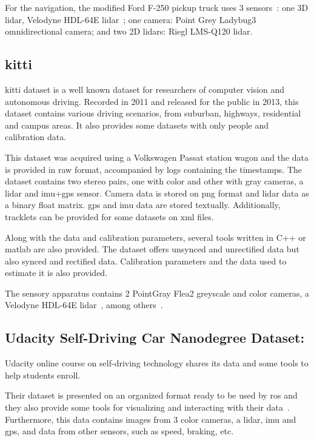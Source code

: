For the navigation, the modified Ford F-250 pickup truck uses 3 sensors~\cite{Pandey2011}: one 3D \ac{lidar}, Velodyne HDL-64E lidar~\cite{Wang2018a}; one camera: Point Grey Ladybug3 omnidirectional camera; and two 2D \acp{lidar}: Riegl LMS-Q120 lidar.


\subsection{\ac{kitti}}
\ac{kitti} dataset is a well known dataset for researchers of computer vision and autonomous driving. Recorded in 2011 and released for the public in 2013, this dataset contains various driving scenarios, from suburban, highways, residential and campus areas. It also provides some datasets with only people and calibration data.

This dataset was acquired using a Volkswagen Passat station wagon and the data is provided in raw format, accompanied by logs containing the timestamps. The dataset contains two stereo pairs, one with color and other with gray cameras, a \ac{lidar} and \ac{imu}+\ac{gps} sensor. Camera data is stored on \ac{png} format and \ac{lidar} data as a binary float matrix. \ac{gps} and {imu} data are stored textually. Additionally, tracklets can be provided for some datasets on \ac{xml} files.

Along with the data and calibration parameters, several tools written in C++ or \ac{matlab} are also provided. The dataset offers unsynced and unrectified data but also synced and rectified data. Calibration parameters and the data used to estimate it is also provided.

The sensory apparatus contains 2 PointGray Flea2 greyscale and color cameras, a Velodyne HDL-64E lidar~\cite{Wang2018a}, among others~\cite{Geiger2013a}.






\subsection{Udacity Self-Driving Car Nanodegree Dataset:}
Udacity online course on self-driving technology shares its data and some tools to help students enroll.

Their dataset is presented on an organized format ready to be used by \ac{ros} and they also provide some tools for visualizing and interacting with their data~\cite{udacity}. Furthermore, this data contains images from 3 color cameras, a \ac{lidar},  \ac{imu} and \ac{gps}, and data from other sensors, such as speed, braking, etc.


